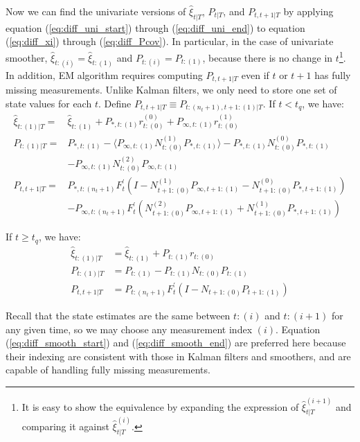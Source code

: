 \documentclass[10pt]{article}
\numberwithin{equation}{section}
\begin{document}
Now we can find the univariate versions of $\hat{\xi}_{t|T}$, $P_{t|T}$, and $P_{t,t+1|T}$ by applying equation (\ref{eq:diff_uni_start}) through (\ref{eq:diff_uni_end}) to equation (\ref{eq:diff_xi}) through (\ref{eq:diff_Pcov}). In particular, in the case of univariate smoother, $\hat{\xi}_{t:(i)}=\hat{\xi}_{t:(1)}$ and $P_{t:(i)}=P_{t:(1)}$, because there is no change in $t$\footnote{It is easy to show the equivalence by expanding the expression of $\hat{\xi}_{t|T}^{(i+1)}$ and comparing it against $\hat{\xi}_{t|T}^{(i)}$.}. In addition, EM algorithm requires computing $P_{t,t+1|T}$ even if $t$ or $t+1$ has fully missing measurements. Unlike Kalman filters, we only need to store one set of state values for each $t$. Define $P_{t,t+1|T} \equiv P_{t:(n_t+1),t+1:(1)|T}$. If $t<t_q$, we have:
\begin{align}
    \hat{\xi}_{t:(1)|T} =& \hat{\xi}_{t:(1)} + P_{*,t:(1)}r_{t:(0)}^{(0)} + P_{\infty,t:(1)}r_{t:(0)}^{(1)} \label{eq:diff_smooth_start} \\
    P_{t:(1)|T} =& P_{*,t:(1)} - \langle P_{\infty,t:(1)}N_{t:(0)}^{(1)}P_{*,t:(1)} \rangle - P_{*,t:(1)}N_{t:(0)}^{(0)}P_{*,t:(1)} \nonumber \\
        &- P_{\infty,t:(1)}N_{t:(0)}^{(2)}P_{\infty,t:(1)} \\
    P_{t,t+1|T} =& P_{*,t:(n_t+1)}F_t^{'}(I-N_{t+1:(0)}^{(1)}P_{\infty,t+1:(1)} - N_{t+1:(0)}^{(0)}P_{*,t+1:(1)}) \nonumber \\
    &- P_{\infty,t:(n_t+1)}F_t^{'}(N_{t+1:(0)}^{(2)}P_{\infty,t+1:(1)}+N_{t+1:(0)}^{(1)}P_{*,t+1:(1)})
\end{align}

If $t \geq t_q$, we have:
\begin{align}
    \hat{\xi}_{t:(1)|T} &= \hat{\xi}_{t:(1)} + P_{t:(1)}r_{t:(0)} \\
    P_{t:(1)|T} &= P_{t:(1)} - P_{t:(1)}N_{t:(0)}P_{t:(1)} \\
    P_{t,t+1|T} &= P_{t:(n_t+1)}F_t^{'}(I - N_{t+1:(0)}P_{t+1:(1)}) \label{eq:diff_smooth_end}
\end{align}

Recall that the state estimates are the same between $t:(i)$ and $t:(i+1)$ for any given time, so we may choose any measurement index $(i)$. Equation (\ref{eq:diff_smooth_start}) and (\ref{eq:diff_smooth_end}) are preferred here because their indexing are consistent with those in Kalman filters and smoothers, and are capable of handling fully missing measurements.
\end{document}
